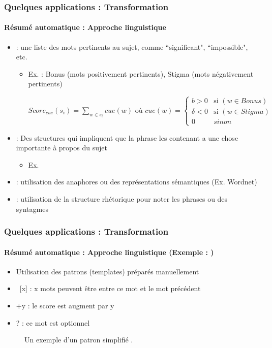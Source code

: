 \documentclass[xcolor=table]{beamer}
\begin{document}
\begin{frame}
	\frametitle{Quelques applications : Transformation}
	\framesubtitle{Résumé automatique : Approche linguistique}
	
	\begin{itemize}
		\item {} : une liste des mots pertinents au sujet, comme ``significant", ``impossible", etc.
		\begin{itemize}
			\item Ex. \cite{69-edmundson} : Bonus (mots positivement pertinents), Stigma (mots négativement pertinents)
			
			$Score_{cue}(s_i) = \sum_{w \in s_i}{cue(w)}
			\text{ où }
			cue(w) = \left\lbrace 
			\begin{array}{ll}
			b > 0 & \text{si } (w \in Bonus) \\
			\delta < 0 & \text{si } (w \in Stigma) \\
			0 & sinon 
			\end{array} 
			\right. $
		\end{itemize}
		\item {} : Des structures qui impliquent que la phrase les contenant a une chose importante à propos du sujet
		\begin{itemize}
			\item Ex. 
		\end{itemize}
		\item {} : utilisation des anaphores ou des représentations sémantiques (Ex. Wordnet)
		\item {} : utilisation de la structure rhétorique pour noter les phrases ou des syntagmes
	\end{itemize}
	
\end{frame}

\begin{frame}
	\frametitle{Quelques applications : Transformation}
	\framesubtitle{Résumé automatique : Approche linguistique (Exemple : \cite{81-paice})}
	
	\begin{itemize}
		\item Utilisation des patrons (templates) préparés manuellement
		\item\ [x] : x mots peuvent être entre ce mot et le mot précédent
		\item +y : le score est augment par y
		\item ? : ce mot est optionnel
	\end{itemize}

	\begin{figure}[!ht]
		\begin{center}
			\caption{Un exemple d'un patron simplifié \cite{81-paice}.}
			\label{fig:paice-template}
		\end{center}
	\end{figure}
	
\end{frame}
\end{document}
